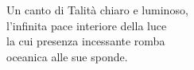 \cleartoverso
\thispagestyle{empty}

\mbox{}
\vspace*{-2\baselineskip}
\vfill

{\fontsize{11}{20}\selectfont
\centering

Un canto di Talità chiaro e luminoso,\\
l'infinita pace interiore della luce\\
la cui presenza incessante romba\\
oceanica alle sue sponde.

}

\vfill
\mbox{}

